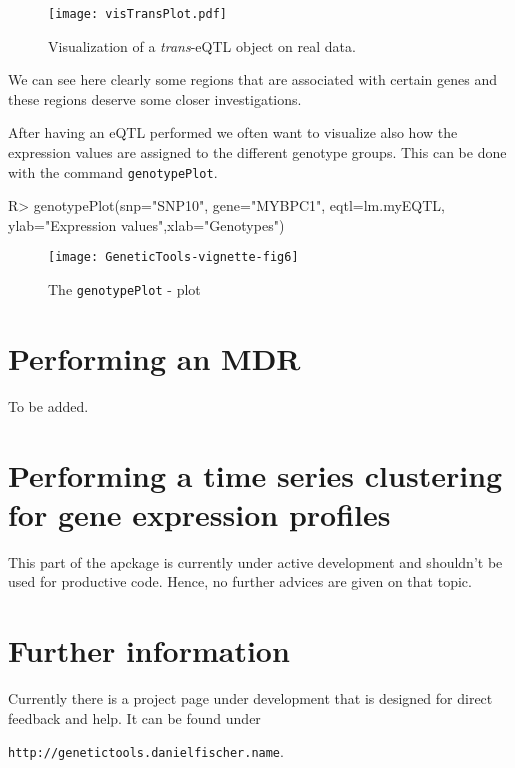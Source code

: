 \documentclass[a4paper,10pt]{article}
\begin{document}
\begin{figure}[!tpb]
\centerline{\texttt{[image: visTransPlot.pdf]}}
\caption{Visualization of a \textit{trans}-eQTL object on real data.}
\label{fig:fig5plot}
\end{figure}

We can see here clearly some regions that are associated with certain genes and these regions deserve some closer investigations.

After having an eQTL performed we often want to visualize also how the expression values are assigned to the different genotype groups. 
This can be done with the command \texttt{genotypePlot}.

\begin{Schunk}
\begin{Sinput}
R> genotypePlot(snp="SNP10", gene="MYBPC1", eqtl=lm.myEQTL, ylab="Expression values",xlab="Genotypes")
\end{Sinput}
\end{Schunk}

\begin{figure}
\begin{center}
\texttt{[image: GeneticTools-vignette-fig6]}
\end{center}
\caption{The \texttt{genotypePlot} - plot}
\label{fig:fig6plot}
\end{figure}

\section{Performing an MDR}
To be added.

\section{Performing a time series clustering for gene expression profiles}
This part of the apckage is currently under active development and shouldn't be used for productive code. Hence, no further advices are given on that topic.

\section{Further information}
Currently there is a project page under development that is designed for direct feedback and help. It can be found under 

\texttt{http://genetictools.danielfischer.name}.
\end{document}
